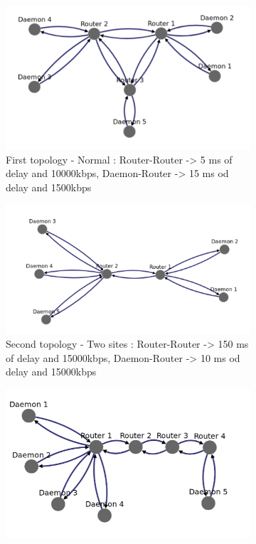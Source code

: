 \documentclass{eplmastersthesis}
\begin{document}
          \begin{figure}[H]
            \begin{subfigure}{.33\textwidth}
              \centering
              \includegraphics[width=1.0\linewidth]{figures/user_case/raft_topo_1.png}
              \caption{First topology - Normal : Router-Router -> 5 ms of delay and 10000kbps, Daemon-Router -> 15 ms od delay and 1500kbps}
              \label{fig:topo1}
            \end{subfigure}
            \begin{subfigure}{.33\textwidth}
              \centering
              \includegraphics[width=1.0\linewidth]{figures/user_case/raft_topo_2.png}
              \caption{Second topology - Two sites : Router-Router -> 150 ms of delay and 15000kbps, Daemon-Router -> 10 ms od delay and 15000kbps}
              \label{fig:topo2}
            \end{subfigure}
            \begin{subfigure}{.33\textwidth}
              \centering
              \includegraphics[width=1.0\linewidth]{figures/user_case/raft_topo_3.png}

\end{subfigure}
\end{figure}
\end{document}
